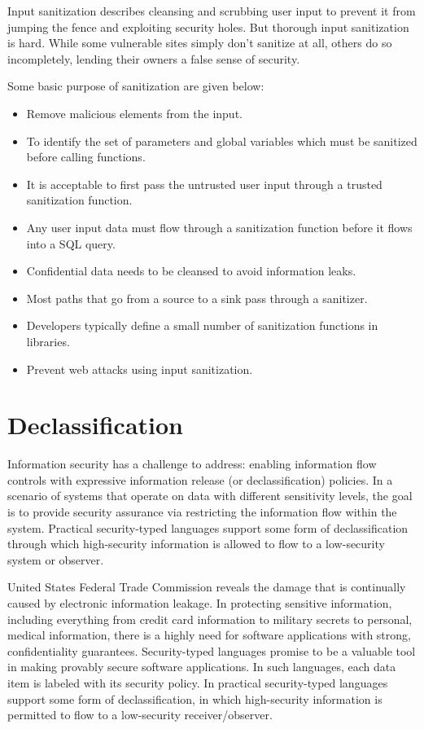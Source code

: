 Input sanitization describes cleansing and scrubbing user input to prevent it from jumping the fence and exploiting security holes. But thorough input sanitization is hard. While some vulnerable sites simply don't sanitize at all, others do so incompletely, lending their owners a false sense of security.

Some basic purpose of sanitization are given below:
\begin{itemize}
	\item Remove malicious elements from the input.
	\item To identify the set of parameters and global variables which must be sanitized before calling functions.
	\item It is acceptable to first pass the untrusted user input through a trusted sanitization function.	
	\item Any user input data must flow through a sanitization function before it flows into a SQL query.
	\item Confidential data needs to be cleansed to avoid information leaks.
	\item Most paths that go from a source to a sink pass through a sanitizer.
	\item Developers typically define a small number of sanitization functions in libraries.
	\item Prevent web attacks using input sanitization.
\end{itemize}

\section{Declassification}
Information security has a challenge to address: enabling information flow controls with expressive information release (or declassification) policies. In a scenario of systems that operate on data with different sensitivity levels, the goal is to provide security assurance via restricting the information flow within the system. Practical security-typed languages support some form of declassification through which high-security information is allowed to flow to a low-security system or observer.

United States Federal Trade Commission reveals the damage that is continually caused by electronic information leakage. In protecting sensitive information, including everything from credit card information to military secrets to personal, medical information, there is a highly
need for software applications with strong, confidentiality guarantees.
Security-typed languages promise to be a valuable tool in making provably secure software applications. In such languages, each
data item is labeled with its security policy. In practical security-typed languages support some form of declassification, in which high-security information is permitted to flow to a low-security receiver/observer.

